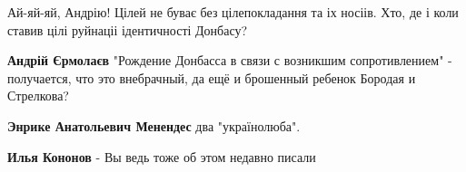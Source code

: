 \begin{itemize}
\begin{itemize}

Ай-яй-яй, Андрію! Цілей не буває без цілепокладання та іх носіів. Хто, де і коли
ставив цілі руйнаціі ідентичності Донбасу?

\textbf{Андрій Єрмолаєв} "Рождение Донбасса в связи с возникшим сопротивлением" - получается, что это внебрачный, да ещё и брошенный ребенок Бородая и Стрелкова?

\textbf{Энрике Анатольевич Менендес} два "українолюба".

\end{itemize} %

\textbf{Илья Кононов} - Вы ведь тоже об этом недавно писали

\end{itemize} %
